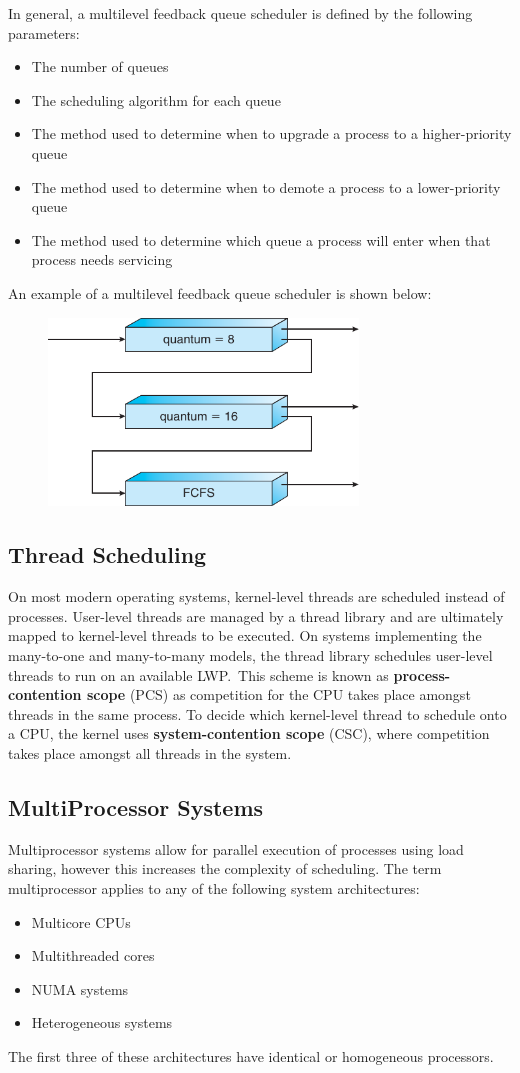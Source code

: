 \documentclass{article}
\begin{document}
In general, a multilevel feedback queue scheduler is defined by the
following parameters:
\begin{itemize}
    \item The number of queues
    \item The scheduling algorithm for each queue
    \item The method used to determine when to upgrade a process to a
          higher-priority queue
    \item The method used to determine when to demote a process to a
          lower-priority queue
    \item The method used to determine which queue a process will enter
          when that process needs servicing
\end{itemize}
An example of a multilevel feedback queue scheduler is shown below:
\begin{figure}[H]
    \centering
    \includegraphics[height = 5cm]{figures/multiple_feedback_queue_scheduling.pdf}
\end{figure}
\subsection{Thread Scheduling}
On most modern operating systems, kernel-level threads are scheduled
instead of processes. User-level threads are managed by a thread
library and are ultimately mapped to kernel-level threads to be
executed. On systems implementing the many-to-one and many-to-many
models, the thread library schedules user-level threads to run on an
available LWP.\ This scheme is known as \linebreak
\textbf{process-contention scope} (PCS) as competition for the CPU
takes place amongst threads in the same process. To decide which
kernel-level thread to schedule onto a CPU, the kernel uses
\textbf{system-contention scope} (CSC), where competition takes place
amongst all threads in the system.
\subsection{MultiProcessor Systems}
Multiprocessor systems allow for parallel execution of processes using
load sharing, however this increases the complexity of scheduling. The
term multiprocessor applies to any of the following system
architectures:
\begin{itemize}
    \item Multicore CPUs
    \item Multithreaded cores
    \item NUMA systems
    \item Heterogeneous systems
\end{itemize}
The first three of these architectures have identical or homogeneous
processors.
\end{document}

